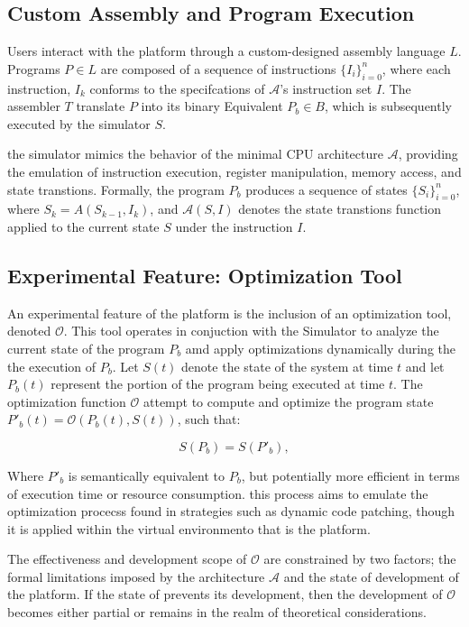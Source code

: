 \subsection{Custom Assembly and Program Execution}
\label{subsec:Custom-Assembly}

Users interact with the \simulator{} platform through a custom-designed assembly language $L$.
Programs $P \in L$ are composed of a sequence of instructions $\{I_i\}_{i = 0}^{n}$, where each 
instruction, $I_{k}$ conforms to the specifcations of $\mathcal{A}$'s instruction set $I$. The 
assembler $T$ translate $P$ into its binary Equivalent $P_{b} \in B$, which is subsequently 
executed by the simulator $S$.

the simulator mimics the behavior of the minimal CPU architecture $\mathcal{A}$, providing the 
emulation of instruction execution, register manipulation, memory access, and state transtions. 
Formally, the program $P_{b}$ produces a sequence of states $\{S_i\}_{i=0}^n$, where $S_k = A(S_{k - 1}, I_{k})$,
and $\mathcal{A}(S,I)$ denotes the state transtions function applied to the current state $S$ under 
the instruction $I$.

\subsection{Experimental Feature: Optimization Tool}
\label{subsec:Experimental-Tool}

An experimental feature of the \simulator{} platform is the inclusion of an optimization 
tool, denoted $\mathcal{O}$. This tool operates in conjuction with the Simulator to analyze the 
current state of the program $P_{b}$ amd apply optimizations dynamically during the 
the execution of $P_{b}$. Let $S(t)$ denote the state of the system at time $t$ and let 
$P_{b}(t)$ represent the portion of the program being executed at time $t$. The optimization 
function $\mathcal{O}$ attempt to compute and optimize the program state 
$P'_{b}(t) = \mathcal{O}(P_{b}(t), S(t))$, such that:

\begin{equation}
  \label{eq:}
  S(P_{b}) = S(P'_{b}),
\end{equation}

Where $P'_{b}$ is semantically equivalent to $P_{b}$, but potentially more efficient in terms 
of execution time or resource consumption. this process aims to emulate the optimization 
procecss found in strategies such as dynamic code patching, though it is applied within the 
virtual environmento that is the \simulator{} platform.

The effectiveness and development scope of $\mathcal{O}$ are constrained by two factors; 
the formal limitations imposed by the architecture $\mathcal{A}$ and the state of development 
of the \simulator{} platform. If the state of \simulator{} prevents its development, then the 
development of $\mathcal{O}$ becomes either partial or remains in the realm of theoretical 
considerations.

\newpage
